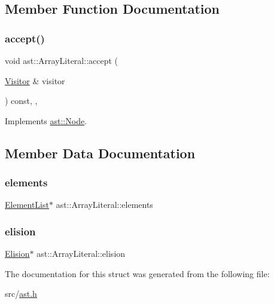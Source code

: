\subsection{Member Function Documentation}
\mbox{\label{structast_1_1_array_literal_a1efd88bd53842200c4b11d8afc17042f}} 
\subsubsection{\texorpdfstring{accept()}{accept()}}
{\footnotesize\ttfamily void ast\+::\+Array\+Literal\+::accept (\begin{DoxyParamCaption}\item[{\hyperlink{structast_1_1_visitor}{Visitor} \&}]{visitor }\end{DoxyParamCaption}) const\hspace{0.3cm}{\ttfamily [inline]}, {\ttfamily [override]}, {\ttfamily [virtual]}}



Implements \hyperlink{structast_1_1_node_abc089ee6caaf06a4445ebdd8391fdebc}{ast\+::\+Node}.



\subsection{Member Data Documentation}
\mbox{\label{structast_1_1_array_literal_a3654b169349b3d309f65da79158dad56}} 
\subsubsection{\texorpdfstring{elements}{elements}}
{\footnotesize\ttfamily \hyperlink{structast_1_1_element_list}{Element\+List}$\ast$ ast\+::\+Array\+Literal\+::elements}

\mbox{\label{structast_1_1_array_literal_ab6c8555816219a172d2b5c44dcbcf8d2}} 
\subsubsection{\texorpdfstring{elision}{elision}}
{\footnotesize\ttfamily \hyperlink{structast_1_1_elision}{Elision}$\ast$ ast\+::\+Array\+Literal\+::elision}



The documentation for this struct was generated from the following file\+:\begin{DoxyCompactItemize}
\item 
src/\hyperlink{ast_8h}{ast.\+h}\end{DoxyCompactItemize}
